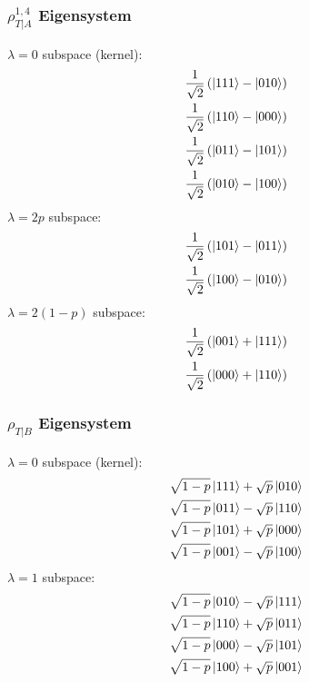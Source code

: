 \documentclass[12pt]{article}
\begin{document}
\subsubsection*{$\rho_{T|A}^{1,4}$ Eigensystem}
$\lambda = 0$ subspace (kernel):
\begin{align*}
    \frac{1}{\sqrt{2}}\left(\ket{111}-\ket{010}\right) \\
    \frac{1}{\sqrt{2}}\left(\ket{110}-\ket{000}\right) \\ 
    \frac{1}{\sqrt{2}}\left(\ket{011}-\ket{101}\right) \\
    \frac{1}{\sqrt{2}}\left(\ket{010}-\ket{100}\right) 
\end{align*}
$\lambda = 2p$ subspace:
\begin{align*}
    \frac{1}{\sqrt{2}}\left(\ket{101}-\ket{011}\right) \\
    \frac{1}{\sqrt{2}}\left(\ket{100}-\ket{010}\right)
\end{align*}
$\lambda = 2(1-p)$ subspace:
\begin{align*}
    \frac{1}{\sqrt{2}}\left(\ket{001}+\ket{111}\right) \\
    \frac{1}{\sqrt{2}}\left(\ket{000}+\ket{110}\right)
\end{align*}

\subsubsection*{$\rho_{T|B}$ Eigensystem}
$\lambda = 0$ subspace (kernel):
\begin{align*}
    \sqrt{1-p}\ket{111} + \sqrt{p}\ket{010} \\
    \sqrt{1-p}\ket{011} - \sqrt{p}\ket{110} \\
    \sqrt{1-p}\ket{101} + \sqrt{p}\ket{000} \\
    \sqrt{1-p}\ket{001} - \sqrt{p}\ket{100} 
\end{align*}
$\lambda = 1$ subspace:
\begin{align*}
    \sqrt{1-p}\ket{010} - \sqrt{p}\ket{111}  \\
    \sqrt{1-p}\ket{110} + \sqrt{p}\ket{011} \\
    \sqrt{1-p}\ket{000} - \sqrt{p}\ket{101} \\
    \sqrt{1-p}\ket{100} + \sqrt{p}\ket{001} 
\end{align*}
\end{document}
